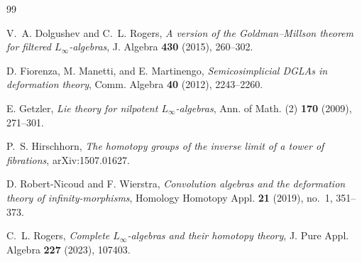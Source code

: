 \documentclass[11pt]{article}
\theoremstyle{definition}
\theoremstyle{remark}
\begin{document}
\begin{thebibliography}{99}

V.~A. Dolgushev and C.~L. Rogers,
\emph{A version of the Goldman--Millson theorem for filtered
$L_\infty$-algebras},
J. Algebra \textbf{430} (2015), 260--302.

D. Fiorenza, M. Manetti, and E. Martinengo,
\emph{Semicosimplicial DGLAs in deformation theory},
Comm. Algebra \textbf{40} (2012), 2243--2260.

E. Getzler,
\emph{Lie theory for nilpotent $L_\infty$-algebras},
Ann. of Math. (2) \textbf{170} (2009), 271--301.

P.~S. Hirschhorn,
\emph{The homotopy groups of the inverse limit of a tower of fibrations},
arXiv:1507.01627.

D. Robert-Nicoud and F. Wierstra,
\emph{Convolution algebras and the deformation theory of
infinity-morphisms},
Homology Homotopy Appl. \textbf{21} (2019), no.~1, 351--373.

C.~L. Rogers,
\emph{Complete $L_\infty$-algebras and their homotopy theory},
J. Pure Appl. Algebra \textbf{227} (2023), 107403.

\end{thebibliography}
\end{document}
